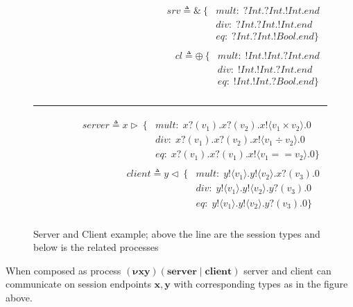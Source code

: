 \begin{figure}[h]
    \centering
    \begin{align*}
        \begin{split}
            srv \triangleq \& \:\{ & mult:\;?Int.?Int.!Int.end \\
            & div:\;?Int.?Int.!Int.end \\
            & eq: \;?Int.?Int.!Bool.end \} \\
        \end{split}
        \begin{split}
            cl \triangleq \oplus \:\{ & mult:\;!Int.!Int.?Int.end \\
            & div:\;!Int.!Int.?Int.end \\
            & eq: \;!Int.!Int.?Bool.end \} \\
        \end{split}
    \end{align*}    
    \noindent\rule{12cm}{0.8pt}
    \begin{align*}
        \begin{split}
            server \triangleq x \vartriangleright \: \{ & mult:\;x?(v_1).x?(v_2).x! \langle v_1 \times v_2 \rangle.0 \\
            & div:\;x?(v_1).x?(v_2).x!\langle v_1 \div v_2 \rangle.0 \\
            & eq: \;x?(v_1).x?(v_1).x!\langle v_1 == v_2 \rangle.0 \} \\
        \end{split}
        \begin{split}
            client \triangleq y \vartriangleleft \:\{ & mult:\;y!\langle v_1 \rangle.y!\langle v_2 \rangle.x?(v_3).0 \\
            & div:\;y!\langle v_1 \rangle.y!\langle v_2 \rangle.y?(v_3).0 \\
            & eq: \;y!\langle v_1 \rangle.y!\langle v_2 \rangle.y?(v_3).0 \} \\
        \end{split}
    \end{align*}
    \caption{Server and Client example; above the line are the session types and below is the related processes}
    \label{fig:clientServerExample1}
\end{figure}

When composed as process $\boldsymbol{(\nu xy) (server \;|\; client)}$ server and client can communicate on session endpoints $\boldsymbol{x, y}$ with corresponding types as in the figure above. 

